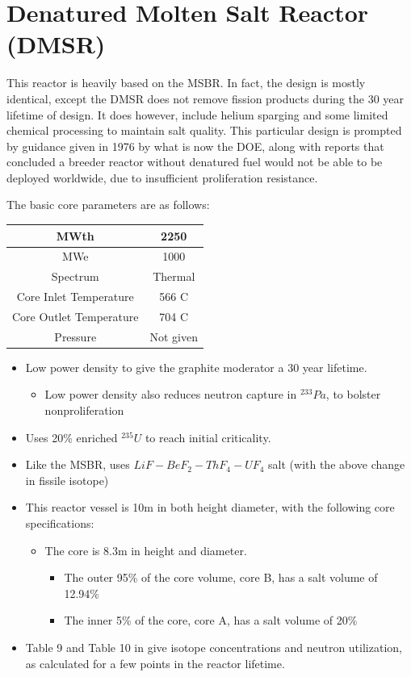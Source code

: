 \documentclass[letterpaper]{article}
\begin{document}
\section{Denatured Molten Salt Reactor (DMSR)}

This reactor is heavily based on the MSBR.  In fact, the design is mostly identical, except the DMSR does not remove fission products during the 30 year lifetime of design.  It does however, include helium sparging and some limited chemical processing to maintain salt quality.  This particular design is prompted by guidance given in 1976 by what is now the DOE, along with reports that concluded a breeder reactor without denatured fuel would not be able to be deployed worldwide, due to insufficient proliferation resistance. \cite{engel_conceptual_1980}

The basic core parameters are as follows:

\begin{center}
\begin{tabular}{|c|c|}
\hline
MWth & 2250 \\
\hline
MWe & 1000 \\
\hline
Spectrum & Thermal \\
\hline
Core Inlet Temperature & 566 C \\
\hline
Core Outlet Temperature & 704 C\\
\hline
Pressure & Not given \\
\hline
\end{tabular}
\end{center}

\begin{itemize}
\item Low power density to give the graphite moderator a 30 year lifetime.
	\begin{itemize}
	\item Low power density also reduces neutron capture in ${}^{233}Pa$, to bolster nonproliferation
	\end{itemize}
\item Uses 20\% enriched ${}^{235}U$ to reach initial criticality.
\item Like the MSBR, uses $LiF - BeF_2 - ThF_4 - UF_4$ salt (with the above change in fissile isotope)
\item This reactor vessel is 10m in both height diameter, with the following core specifications:
	\begin{itemize}
	\item The core is 8.3m in height and diameter.
		\begin{itemize}
		\item The outer 95\% of the core volume, core B, has a salt volume of 12.94\%
		\item The inner 5\% of the core, core A, has a salt volume of 20\%
		\end{itemize}
	\end{itemize}
\item Table 9 and Table 10 in \cite{engel_conceptual_1980} give isotope concentrations and neutron utilization, as calculated for a few points in the reactor lifetime.
\end{itemize}
\end{document}
